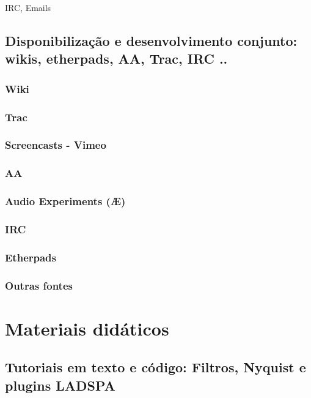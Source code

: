       IRC, Emails

\subsection{Disponibilização e desenvolvimento conjunto: wikis, etherpads, AA, Trac, IRC ..}

\subsubsection{Wiki}

\subsubsection{Trac}

\subsubsection{Screencasts - Vimeo}

\subsubsection{AA}

\subsubsection{Audio Experiments (Æ)}

\subsubsection{IRC}

\subsubsection{Etherpads}

\subsubsection{Outras fontes}


\section{Materiais didáticos}

  \subsection{Tutoriais em texto e código: Filtros, Nyquist e plugins LADSPA}

